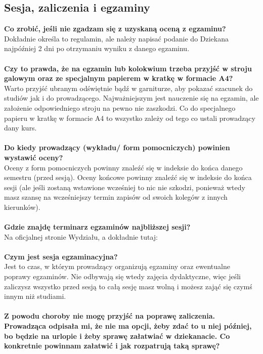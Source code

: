 \documentclass[11pt]{article}
\begin{document}
\subsection{Sesja, zaliczenia i egzaminy}
\textbf{Co zrobić, jeśli nie zgadzam się z uzyskaną oceną z egzaminu?} \\
\indent Dokładnie określa to regulamin, ale należy napisać podanie do Dziekana najpóźniej 2 dni po otrzymaniu wyniku z danego egzaminu. \\\\
\textbf{Czy to prawda, że na egzamin lub kolokwium trzeba przyjść w stroju galowym oraz ze specjalnym papierem w kratkę w formacie A4?} \\
\indent Warto przyjść ubranym odświętnie bądź w garniturze, aby pokazać szacunek do studiów jak i do prowadzącego. Najważniejszym jest nauczenie się na egzamin, ale założenie odpowiedniego stroju na pewno nie zaszkodzi. Co do specjalnego papieru w kratkę w formacie A4 to wszystko zależy od tego co ustali prowadzący dany kurs. \\\\
\textbf{Do kiedy prowadzący (wykładu/ form pomocniczych) powinien wystawić oceny?} \\
\indent Oceny z form pomocniczych powinny znaleźć się w indeksie do końca danego semestru (przed sesją). Oceny końcowe powinny znaleźć się w indeksie do końca sesji (ale jeśli zostaną wstawione wcześniej to nic nie szkodzi, ponieważ wtedy masz szansę na wcześniejszy termin zapisów od swoich kolegów z innych kierunków). \\\\
\textbf{Gdzie znajdę terminarz egzaminów najbliższej sesji?} \\
Na oficjalnej stronie Wydziału, a dokładnie tutaj:
{} \\\\
\textbf{Czym jest sesja egzaminacyjna?} \\
\indent Jest to czas, w którym prowadzący organizują egzaminy oraz ewentualne poprawy egzaminów. Nie odbywają się wtedy zajęcia dydaktyczne, więc jeśli zaliczysz wszystko przed sesją to całą sesję masz wolną i możesz zająć się czymś innym niż studiami. \\\\
\textbf{Z powodu choroby nie mogę przyjść na poprawę zaliczenia. Prowadząca odpisała mi, że nie ma opcji, żeby zdać to u niej później, bo będzie na urlopie i żeby sprawę załatwiać w dziekanacie. Co konkretnie powinnam załatwić i jak rozpatrują taką sprawę?} \\
\end{document}
